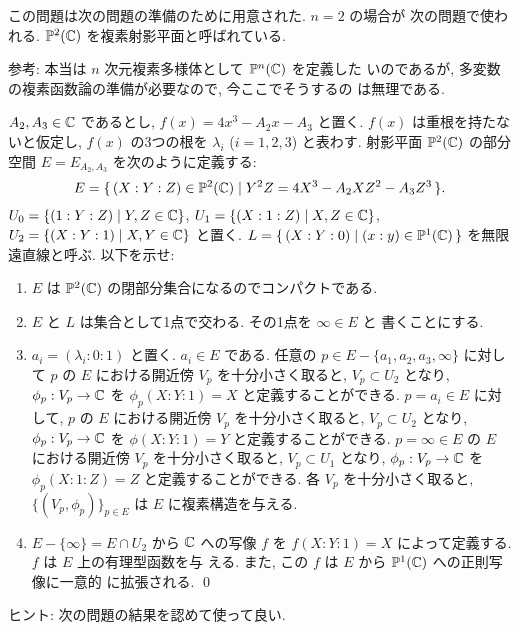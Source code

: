 \documentclass[12pt,twoside]{jarticle}
\def\setminus{-}
\def\C{{\Bbb C}} %
\def\P{{\Bbb P}}
\begin{document}
\noindent この問題は次の問題の準備のために用意された.  $n=2$ の場合が
次の問題で使われる. $\P^2(\C)$ を複素射影平面と呼ばれている.

\medskip

\noindent 参考: 本当は $n$ 次元複素多様体として $\P^n(\C)$ を定義した
いのであるが, 多変数の複素函数論の準備が必要なので, 今ここでそうするの
は無理である. 

\begin{question}[平面曲線としての楕円曲線]\label{q:plane-ec}\qstar{*}
  $A_2,A_3\in\C$ であるとし, $f(x) = 4x^3 - A_2x - A_3$ と置く. %
  $f(x)$ は重根を持たないと仮定し, $f(x)$ の3つの根を $\lambda_i$ %
  ($i=1,2,3$) と表わす. 射影平面 $\P^2(\C)$ の部分空間 %
  $E=E_{A_2,A_3}$ を次のように定義する:
  \[
    E = 
    \{\, (X:Y:Z) \in \P^2(\C) \mid
      Y^2 Z = 4X^3 - A_2 X Z^2 - A_3 Z^3 \,\}.
  \] %
  $U_0 = \{(1:Y:Z)\mid Y,Z\in\C\}$, $U_1=\{(X:1:Z)\mid X,Z\in\C\}$, 
  $U_2 = \{(X:Y:1)\mid X,Y\in\C\}$ と置く. 
  $L = \{\,(X:Y:0)\mid(x:y)\in\P^1(\C)\,\}$ を無限遠直線と呼ぶ. 
  以下を示せ:
  \begin{enumerate}
  \item $E$ は $\P^2(\C)$ の閉部分集合になるのでコンパクトである. 
  \item $E$ と $L$ は集合として1点で交わる. その1点を $\infty\in E$ と
    書くことにする. 
  \item $a_i=(\lambda_i:0:1)$ と置く. $a_i\in E$ である. 任意の %
    $p\in E \setminus\{a_1,a_2,a_3,\infty\}$ %
    に対して $p$ の $E$ における開近傍 $V_p$ を十分小さく取ると, %
    $V_p \subset U_2$ となり, $\phi_p : V_p \to \C$ を %
    $\phi_p(X:Y:1) = X$ と定義することができる. %
    $p = a_i\in E$ に対して, %
    $p$ の $E$ における開近傍 $V_p$ を十分小さく取ると, %
    $V_p \subset U_2$ となり, %
    $\phi_p : V_p \to \C$ を $\phi(X:Y:1) = Y$ と定義することができる. %
    $p=\infty\in E$ の $E$ における開近傍 $V_p$ を十分小さく取ると,
    $V_p\subset U_1$ となり, $\phi_p : V_p \to \C$ を %
    $\phi_p(X:1:Z) = Z$ と定義することができる. %
    各 $V_p$ を十分小さく取ると, 
    $\{(V_p,\phi_p)\}_{p\in E}$ は $E$ に複素構造を与える.
  \item $E \setminus \{\infty\} = E \cap U_2$ から $\C$ への写像 $f$ 
    を $f(X:Y:1) = X$ によって定義する. $f$ は $E$ 上の有理型函数を与
    える. また, この $f$ は $E$ から $\P^1(\C)$ への正則写像に一意的
    に拡張される.
    \qed
  \end{enumerate}
\end{question}

\noindent ヒント: 次の問題の結果を認めて使って良い.
\end{document}
